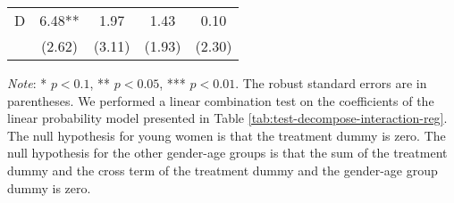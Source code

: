 \documentclass[12pt, a4paper]{article}
\begin{document}
\begin{table}[H]
\begin{threeparttable}
\begin{tabular}[t]{lcccc}
\hspace{1em}D & 6.48** & 1.97 & 1.43 & 0.10\\
\hspace{1em} & (2.62) & (3.11) & (1.93) & (2.30)\\
\bottomrule
\end{tabular}
\begin{tablenotes}
\item \emph{Note}: * $p < 0.1$, ** $p < 0.05$, *** $p < 0.01$. The robust standard errors are in parentheses. We performed a linear combination test on the coefficients of the linear probability model presented in Table \ref{tab:test-decompose-interaction-reg}. The null hypothesis for young women is that the treatment dummy is zero. The null hypothesis for the other gender-age groups is that the sum of the treatment dummy and the cross term of the treatment dummy and the gender-age group dummy is zero.
\end{tablenotes}
\end{threeparttable}
\end{table}
\end{document}
